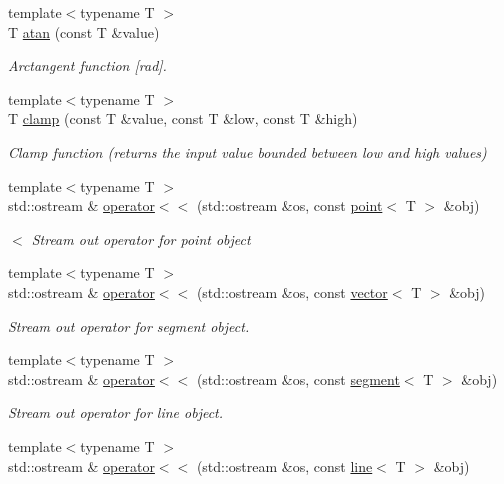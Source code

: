 \begin{DoxyCompactItemize}
{\footnotesize template$<$typename T $>$ }\\T \hyperlink{namespaceddd_a750f7cad6893bbbfbaa51353044bde4f}{atan} (const T \&value)
\begin{DoxyCompactList}\small\item\em Arctangent function \mbox{[}rad\mbox{]}. \end{DoxyCompactList}\item 
{\footnotesize template$<$typename T $>$ }\\T \hyperlink{namespaceddd_a070060e53a22cb16f07576bfb5c4b1cc}{clamp} (const T \&value, const T \&low, const T \&high)
\begin{DoxyCompactList}\small\item\em Clamp function (returns the input value bounded between low and high values) \end{DoxyCompactList}\item 
{\footnotesize template$<$typename T $>$ }\\std\+::ostream \& \hyperlink{namespaceddd_a02d73e2ba5a018e4e525deb8aea3c0a8}{operator$<$$<$} (std\+::ostream \&os, const \hyperlink{classddd_1_1point}{point}$<$ T $>$ \&obj)
\begin{DoxyCompactList}\small\item\em $<$ Stream out operator for point object \end{DoxyCompactList}\item 
{\footnotesize template$<$typename T $>$ }\\std\+::ostream \& \hyperlink{namespaceddd_a85783ffbd6985b1981059732d7bbe174}{operator$<$$<$} (std\+::ostream \&os, const \hyperlink{classddd_1_1vector}{vector}$<$ T $>$ \&obj)
\begin{DoxyCompactList}\small\item\em Stream out operator for segment object. \end{DoxyCompactList}\item 
{\footnotesize template$<$typename T $>$ }\\std\+::ostream \& \hyperlink{namespaceddd_a59e2fa950fd945aa8b3dd550720ad3f5}{operator$<$$<$} (std\+::ostream \&os, const \hyperlink{classddd_1_1segment}{segment}$<$ T $>$ \&obj)
\begin{DoxyCompactList}\small\item\em Stream out operator for line object. \end{DoxyCompactList}\item 
{\footnotesize template$<$typename T $>$ }\\std\+::ostream \& \hyperlink{namespaceddd_a2001eec5d960802592e1ca6a5b0dc203}{operator$<$$<$} (std\+::ostream \&os, const \hyperlink{classddd_1_1line}{line}$<$ T $>$ \&obj)

\end{DoxyCompactItemize}
